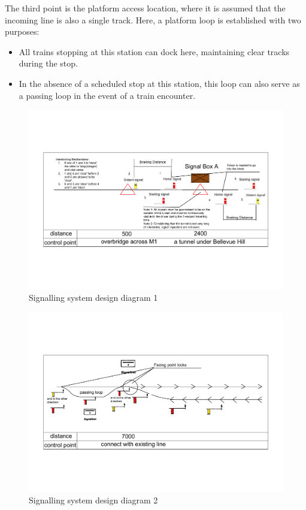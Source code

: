 \documentclass[letterpaper,12pt,leqno]{article}
\begin{document}
The third point is the platform access location, where it is assumed that the incoming line is also a single track. Here, a platform loop is established with two purposes:
\begin{itemize}
    \item All trains stopping at this station can dock here, maintaining clear tracks during the stop.
    \item In the absence of a scheduled stop at this station, this loop can also serve as a passing loop in the event of a train encounter.
\end{itemize}
\begin{figure}[H]
	\centering
	\includegraphics[width=\linewidth]{figure/t5-模型.pdf}
	\caption{Signalling system design diagram 1}
	\label{signal1}
\end{figure}
\begin{figure}[H]
	\centering
	\includegraphics[width=\linewidth]{figure/t5-模型2.pdf}
	\caption{Signalling system design diagram 2}
    \label{signal2}
\end{figure}
\end{document}
